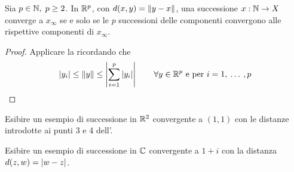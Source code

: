 \begin{proposition}
	\label{prop:succ_conv_se_comp_conv}
	Sia $p \in \mathbb{N},\; p \geq 2$. In $\mathbb{R}^p$, con $d(x,y) = \left\|y-x\right\|$, una successione $x: \mathbb{N} \to X$ converge a $x_\infty$ se e solo se le $p$ successioni delle componenti convergono alle rispettive componenti di $x_\infty$.
	\begin{proof}
		Applicare la  ricordando che
		\[\left|y_i\right| \leq \left\|y\right\| \leq \left|\sum\limits_{i = 1}^p \left|y_i\right|\right| \qquad \forall y \in \mathbb{R}^p \text{ e per } i = 1,\:\dotsc\:,p\]
	\end{proof}
\end{proposition}
\begin{exercise}
	Esibire un esempio di successione in $\mathbb{R}^2$ convergente a $(1,1)$ con le distanze introdotte ai punti 3 e 4 dell'.
\end{exercise}
\begin{exercise}
	Esibire un esempio di successione in $\mathbb{C}$ convergente a $1+i$ con la distanza $d(z,w) = \left|w-z\right|$.
\end{exercise}
